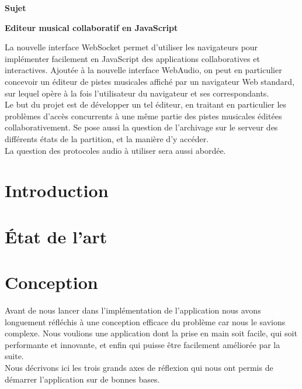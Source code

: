 \documentclass[pdftex,12pt,a4paper]{article}
\begin{document}



\begin{center}
{\huge \bfseries Sujet}\\[1.5cm]
\end{center}
{\Large \bfseries Editeur musical collaboratif en JavaScript}

\bigskip
La nouvelle interface WebSocket permet d’utiliser les navigateurs pour implémenter facilement en JavaScript des applications collaboratives et interactives. Ajoutée à la nouvelle interface WebAudio, on peut en particulier concevoir un éditeur de pistes musicales affiché par un navigateur Web standard, sur lequel opère à la fois l’utilisateur du navigateur et ses correspondants.\\
Le but du projet est de développer un tel éditeur, en traitant en particulier les problèmes d’accès concurrents à une même partie des pistes musicales éditées collaborativement. Se pose aussi la question de l’archivage sur le serveur des différents états de la partition, et la manière d’y accéder.\\
La question des protocoles audio à utiliser sera aussi abordée.

\vfill

\pagebreak

\tableofcontents

\pagebreak

\section{Introduction}

\section{État de l'art}


\section{Conception}

Avant de nous lancer dans l’implémentation de l’application nous avons longuement réfléchis à une conception efficace du problème car nous le savions complexe. Nous voulions une application dont la prise en main soit facile, qui soit performante et innovante, et enfin qui puisse être facilement améliorée par la suite.\\
Nous décrivons ici les trois grands axes de réflexion qui nous ont permis de démarrer l’application sur de bonnes bases.
\end{document}
